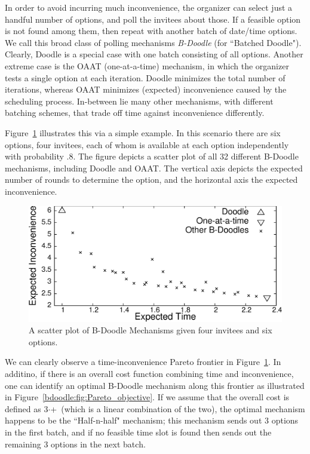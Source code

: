 In order to avoid incurring much inconvenience, 
the organizer can select just a handful number of options,
and poll the invitees about those. If a feasible option is not found
among them, then repeat with another batch of date/time options. 
We call this broad class of polling mechanisms \emph{B-Doodle} (for ``Batched Doodle").
Clearly, Doodle is a special case with one batch consisting of all
options. Another extreme case is the OAAT (one-at-a-time)
mechanism, in which the organizer tests a single option at each
iteration. Doodle minimizes the total number of iterations, whereas 
OAAT minimizes (expected) inconvenience caused by the scheduling process.
In-between lie many other mechanisms, with different
batching schemes, that trade off time against inconvenience
differently.

Figure~\ref{bdoodle:fig:Pareto_scatter} illustrates this via a simple example.
In this scenario there are six options, four invitees, each of whom
is available at each option independently with probability $.8$.
The figure depicts a scatter plot of all 32 different B-Doodle mechanisms,
including Doodle and OAAT. The vertical axis depicts the expected
number of rounds to determine the option, and the horizontal axis
the expected inconvenience.

\begin{figure}[h!] \small
\centering
\includegraphics[scale=0.48]{plots/pareto_scatter_fin.eps}
\caption{A scatter plot of B-Doodle Mechanisms given four invitees and six options.}
\label{bdoodle:fig:Pareto_scatter}
\end{figure}

We can clearly observe a time-inconvenience Pareto frontier in Figure~\ref{bdoodle:fig:Pareto_scatter}. 
In additino, if there is an overall cost function combining time
and inconvenience, one can identify an optimal B-Doodle mechanism
along this frontier as illustrated in
Figure~\ref{bdoodle:fig:Pareto_objective}. 
If we assume that the overall cost is defined as 3$\cdot$\Time+\Inconvenience\ (which is a linear combination of the two), the optimal mechanism happens to be the ``Half-n-half" mechanism; this mechanism
sends out $3$ options in the first batch, and if no feasible time
slot is found then sends out the remaining $3$ options in the next
batch.

